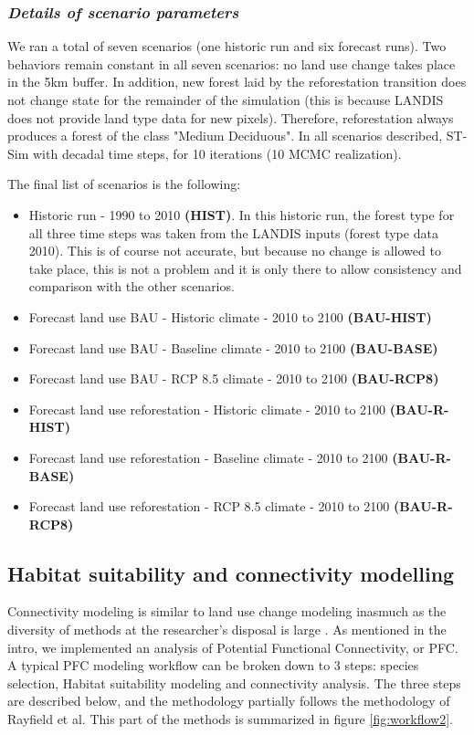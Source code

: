 \subsubsection*{\textit{Details of scenario parameters}}

We ran a total of seven scenarios (one historic run and six forecast runs). Two behaviors remain constant in all seven scenarios: no land use change  takes place in the 5km buffer. In addition, new forest laid by the reforestation transition does not change state for the remainder of the simulation (this is because LANDIS does not provide land type data for new pixels). Therefore, reforestation always produces a forest of the class "Medium Deciduous". In all scenarios described, ST-Sim with decadal time steps, for 10 iterations (10 MCMC realization).

The final list of scenarios is the following:
\begin{itemize}
\item Historic run - 1990 to 2010 \textbf{(HIST)}. In this historic run, the forest type for all three time steps was taken from the LANDIS inputs (forest type data 2010). This is of course not accurate, but because no change is allowed to take place, this is not a problem and it is only there to allow consistency and comparison with the other scenarios.
\item Forecast land use BAU - Historic climate - 2010 to 2100 \textbf{(BAU-HIST)}
\item Forecast land use BAU - Baseline climate - 2010 to 2100 \textbf{(BAU-BASE)}
\item Forecast land use BAU - RCP 8.5 climate - 2010 to 2100 \textbf{(BAU-RCP8)}
\item Forecast land use reforestation - Historic climate - 2010 to 2100 \textbf{(BAU-R-HIST)}
\item Forecast land use reforestation - Baseline climate - 2010 to 2100 \textbf{(BAU-R-BASE)}
\item Forecast land use reforestation - RCP 8.5 climate - 2010 to 2100 \textbf{(BAU-R-RCP8)}\\
\end{itemize}

\subsection{Habitat suitability and connectivity modelling}

Connectivity modeling is similar to land use change modeling inasmuch as the diversity of methods at the researcher’s disposal is large \citep{calabrese_comparison_2004}. As mentioned in the intro, we implemented an analysis of Potential Functional Connectivity, or PFC. A typical PFC modeling workflow can be broken down to 3 steps: species selection, Habitat suitability modeling and connectivity analysis. The three steps are described below, and the methodology partially follows the methodology of Rayfield et al. This part of the methods is summarized in figure \ref{fig:workflow2}.\\

